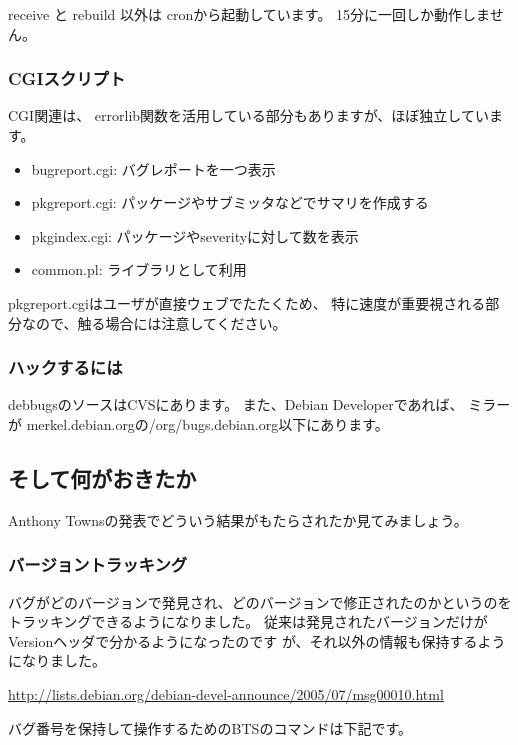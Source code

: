 \documentclass[mingoth,a4paper]{jsarticle}
\begin{document}
receive と rebuild 以外は cronから起動しています。
15分に一回しか動作しません。

\subsubsection{CGIスクリプト}

CGI関連は、
errorlib関数を活用している部分もありますが、ほぼ独立しています。

\begin{itemize}
 \item bugreport.cgi: バグレポートを一つ表示
 \item pkgreport.cgi: パッケージやサブミッタなどでサマリを作成する
 \item pkgindex.cgi: パッケージやseverityに対して数を表示
 \item common.pl: ライブラリとして利用
\end{itemize}

pkgreport.cgiはユーザが直接ウェブでたたくため、
特に速度が重要視される部分なので、触る場合には注意してください。

\subsubsection{ハックするには}

debbugsのソースはCVSにあります。
また、Debian Developerであれば、
ミラーが merkel.debian.orgの/org/bugs.debian.org以下にあります。

\subsection{そして何がおきたか}

Anthony Townsの発表でどういう結果がもたらされたか見てみましょう。

\subsubsection{バージョントラッキング}

バグがどのバージョンで発見され、どのバージョンで修正されたのかというのを
トラッキングできるようになりました。
従来は発見されたバージョンだけがVersionヘッダで分かるようになったのです
が、それ以外の情報も保持するようになりました。

\url{http://lists.debian.org/debian-devel-announce/2005/07/msg00010.html}

バグ番号を保持して操作するためのBTSのコマンドは下記です。
\end{document}

